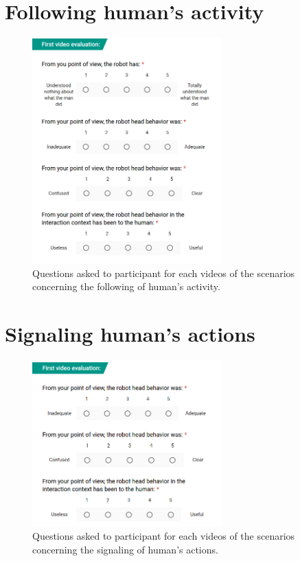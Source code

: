 \newpage
\section{Following human's activity}


\begin{figure}[!h]
	\centering
    \includegraphics[width=0.65\textwidth]{figs/Chapter6/QuestionsSce2.png}
    \caption{Questions asked to participant for each videos of the scenarios concerning the following of human's activity.}
    \label{fig:QuestionsSce2}
\end{figure}

\newpage
\section{Signaling human's actions}

\begin{figure}[!h]
	\centering
    \includegraphics[width=0.65\textwidth]{figs/Chapter6/QuestionsSce4.png}
    \caption{Questions asked to participant for each videos of the scenarios concerning the signaling of human's actions.}
    \label{fig:QuestionsSce4}
\end{figure}

